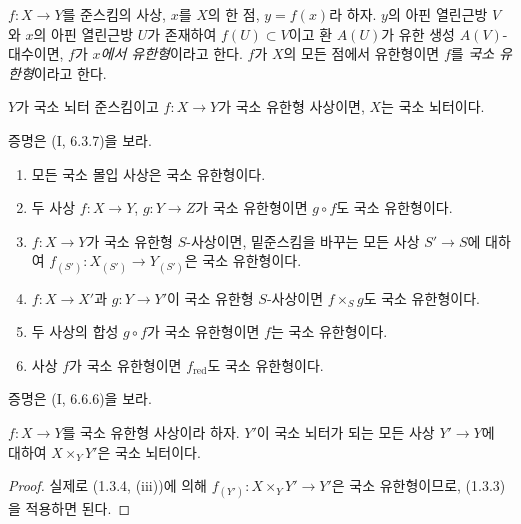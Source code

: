 \begin{definition}[1.3.2]
\label{IV.1.3.2-fr}
$f:X\to Y$를 준스킴의 사상, $x$를 $X$의 한 점,
$y=f(x)$라 하자. $y$의 아핀 열린근방 $V$와 $x$의 아핀 열린근방
$U$가 존재하여 $f(U)\subset V$이고 환 $A(U)$가 유한 생성
$A(V)$-대수이면, $f$가 \emph{$x$에서 유한형}이라고 한다. $f$가
$X$의 모든 점에서 유한형이면 $f$를 \emph{국소 유한형}이라고 한다.
\end{definition}


\begin{proposition}[1.3.3]
\label{IV.1.3.3-fr}
$Y$가 국소 뇌터 준스킴이고 $f:X\to Y$가 국소 유한형 사상이면,
$X$는 국소 뇌터이다.
\end{proposition}

증명은 (I, 6.3.7)을 보라.

\begin{proposition}[1.3.4]
\label{IV.1.3.4-fr}
\begin{enumerate}
  \item[(i)] 모든 국소 몰입 사상은 국소 유한형이다.
  \item[(ii)] 두 사상 $f:X\to Y$, $g:Y\to Z$가 국소 유한형이면
  $g\circ f$도 국소 유한형이다.
  \item[(iii)] $f:X\to Y$가 국소 유한형 $S$-사상이면, 밑준스킴을
  바꾸는 모든 사상 $S'\to S$에 대하여
  $f_{(S')}:X_{(S')}\to Y_{(S')}$은 국소 유한형이다.
  \item[(iv)] $f:X\to X'$과 $g:Y\to Y'$이 국소 유한형
  $S$-사상이면 $f\times_Sg$도 국소 유한형이다.
  \item[(v)] 두 사상의 합성 $g\circ f$가 국소 유한형이면 $f$는
  국소 유한형이다.
  \item[(vi)] 사상 $f$가 국소 유한형이면 $f_{\mathrm{red}}$도
  국소 유한형이다.
\end{enumerate}
\end{proposition}

증명은 (I, 6.6.6)을 보라.

\begin{corollary}[1.3.5]
\label{IV.1.3.5-fr}
$f:X\to Y$를 국소 유한형 사상이라 하자. $Y'$이 국소 뇌터가 되는
모든 사상 $Y'\to Y$에 대하여 $X\times_YY'$은 국소 뇌터이다.
\end{corollary}

\begin{proof}
실제로 (1.3.4, (iii))에 의해
$f_{(Y')}:X\times_YY'\to Y'$은 국소 유한형이므로, (1.3.3)을
적용하면 된다.
\end{proof}

